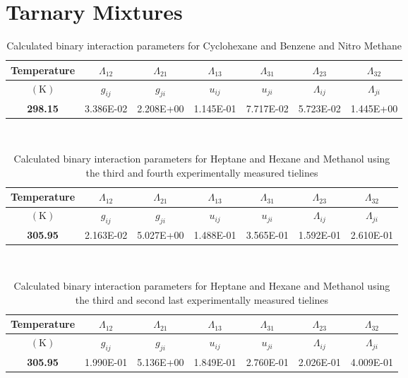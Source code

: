 \section{Tarnary Mixtures}


\begin{table}
\begin{tabularx}{\textwidth}{c|cc|cc|cc}
\hline
\textbf{Temperature}&$\Lambda_12$&$\Lambda_21$&$\Lambda_13$&$\Lambda_31$&$\Lambda_23$&$\Lambda_32$\\
\hline
\hline
$\left(\mathrm{K}\right)$&$g_{ij}$&$g_{ji}$&$u_{ij}$&$u_{ji}$&$\Lambda_{ij}$&$\Lambda_{ji}$\\
\hline
\textbf{ 298.15 } & 3.386E-02 & 2.208E+00 & 1.145E-01 & 7.717E-02 & 5.723E-02 & 1.445E+00\\
\hline 
\end{tabularx}\\
\caption{Calculated binary interaction parameters for Cyclohexane and Benzene and Nitro Methane} \label{cyclohexane-benzene-methanenitroTable}
\end{table}



\begin{table}
\begin{tabularx}{\textwidth}{c|cc|cc|cc}
\hline
\textbf{Temperature}&$\Lambda_12$&$\Lambda_21$&$\Lambda_13$&$\Lambda_31$&$\Lambda_23$&$\Lambda_32$\\
\hline
\hline
$\left(\mathrm{K}\right)$&$g_{ij}$&$g_{ji}$&$u_{ij}$&$u_{ji}$&$\Lambda_{ij}$&$\Lambda_{ji}$\\
\hline
\textbf{ 305.95 } & 2.163E-02 & 5.027E+00 & 1.488E-01 & 3.565E-01 & 1.592E-01 & 2.610E-01\\
\hline 
\end{tabularx}\\
\caption{Calculated binary interaction parameters for Heptane and Hexane and Methanol using the third and fourth experimentally measured tielines} \label{heptane-hexane-methanolTable1}
\end{table}


\begin{table}
\begin{tabularx}{\textwidth}{c|cc|cc|cc}
\hline
\textbf{Temperature}&$\Lambda_12$&$\Lambda_21$&$\Lambda_13$&$\Lambda_31$&$\Lambda_23$&$\Lambda_32$\\
\hline
\hline
$\left(\mathrm{K}\right)$&$g_{ij}$&$g_{ji}$&$u_{ij}$&$u_{ji}$&$\Lambda_{ij}$&$\Lambda_{ji}$\\
\hline
\textbf{ 305.95 } & 1.990E-01 & 5.136E+00 & 1.849E-01 & 2.760E-01 & 2.026E-01 & 4.009E-01\\
\hline 
\end{tabularx}\\
\caption{Calculated binary interaction parameters for Heptane and Hexane and Methanol using the third and second last experimentally measured tielines} \label{heptane-hexane-methanolTable2}
\end{table}




